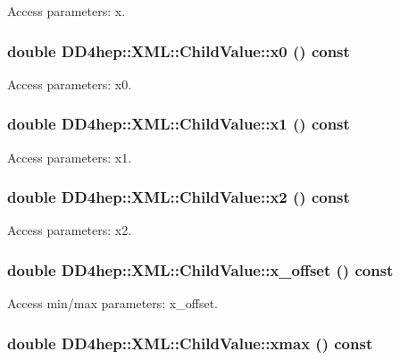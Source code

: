 Access parameters: x. \hypertarget{struct_d_d4hep_1_1_x_m_l_1_1_child_value_a0d67f5159d98e5ff7d2598d82628bd70}{
\subsubsection[{x0}]{\setlength{\rightskip}{0pt plus 5cm}double DD4hep::XML::ChildValue::x0 () const}}
\label{struct_d_d4hep_1_1_x_m_l_1_1_child_value_a0d67f5159d98e5ff7d2598d82628bd70}


Access parameters: x0. \hypertarget{struct_d_d4hep_1_1_x_m_l_1_1_child_value_a165161751d77ddb7834f2432a201edfb}{
\subsubsection[{x1}]{\setlength{\rightskip}{0pt plus 5cm}double DD4hep::XML::ChildValue::x1 () const}}
\label{struct_d_d4hep_1_1_x_m_l_1_1_child_value_a165161751d77ddb7834f2432a201edfb}


Access parameters: x1. \hypertarget{struct_d_d4hep_1_1_x_m_l_1_1_child_value_a4dfd144819bbe7e5fd731b82a2787fe7}{
\subsubsection[{x2}]{\setlength{\rightskip}{0pt plus 5cm}double DD4hep::XML::ChildValue::x2 () const}}
\label{struct_d_d4hep_1_1_x_m_l_1_1_child_value_a4dfd144819bbe7e5fd731b82a2787fe7}


Access parameters: x2. \hypertarget{struct_d_d4hep_1_1_x_m_l_1_1_child_value_a24a2b33be08ebef85fc8201164e5b523}{
\subsubsection[{x\_\-offset}]{\setlength{\rightskip}{0pt plus 5cm}double DD4hep::XML::ChildValue::x\_\-offset () const}}
\label{struct_d_d4hep_1_1_x_m_l_1_1_child_value_a24a2b33be08ebef85fc8201164e5b523}


Access min/max parameters: x\_\-offset. \hypertarget{struct_d_d4hep_1_1_x_m_l_1_1_child_value_a9554fb0926ceaaf4e97a8a9b1a0c9305}{
\subsubsection[{xmax}]{\setlength{\rightskip}{0pt plus 5cm}double DD4hep::XML::ChildValue::xmax () const}}
\label{struct_d_d4hep_1_1_x_m_l_1_1_child_value_a9554fb0926ceaaf4e97a8a9b1a0c9305}



